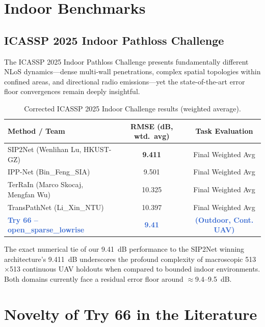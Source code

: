 \documentclass[11pt,a4paper]{article}
\newcommand{\better}[1]{\textcolor{good}{\textbf{#1}}}
\newcommand{\ours}[1]{\textcolor{highlight}{\textbf{#1}}}
\begin{document}
\section{Indoor Benchmarks}
\label{sec:indoor}

\subsection{ICASSP 2025 Indoor Pathloss Challenge}

The ICASSP 2025 Indoor Pathloss Challenge \cite{icassp2025indoor} presents fundamentally different NLoS dynamics—dense multi-wall penetrations, complex spatial topologies within confined areas, and directional radio emissions—yet the state-of-the-art error floor convergences remain deeply insightful.

\begin{table}[h!]
\centering
\caption{Corrected ICASSP 2025 Indoor Challenge results (weighted average).}
\label{tab:icassp2025}
\small
\begin{tabular}{lcc}
\toprule
\textbf{Method / Team} & \textbf{RMSE (dB, wtd.\ avg)} & \textbf{Task Evaluation} \\
\midrule
SIP2Net (Wenlihan Lu, HKUST-GZ) \cite{sip2net2025} & \better{9.411} & Final Weighted Avg \\
IPP-Net (Bin\_Feng\_SIA) \cite{ippnet2025} & 9.501 & Final Weighted Avg \\
TerRaIn (Marco Skocaj, Mengfan Wu) \cite{terrain2025} & 10.325 & Final Weighted Avg \\
TransPathNet (Li\_Xin\_NTU) \cite{transPathNet2025} & 10.397 & Final Weighted Avg \\
\midrule
\ours{Try 66 -- open\_sparse\_lowrise} & \ours{9.41} & \ours{(Outdoor, Cont. UAV)} \\
\bottomrule
\end{tabular}
\end{table}
\normalsize
The exact numerical tie of our 9.41~dB performance to the SIP2Net \cite{sip2net2025} winning architecture's 9.411~dB underscores the profound complexity of macroscopic 513$\times$513 continuous UAV holdouts when compared to bounded indoor environments. Both domains currently face a residual error floor around $\approx$9.4--9.5~dB.

\section{Novelty of Try 66 in the Literature}
\label{sec:novelty}
\end{document}
